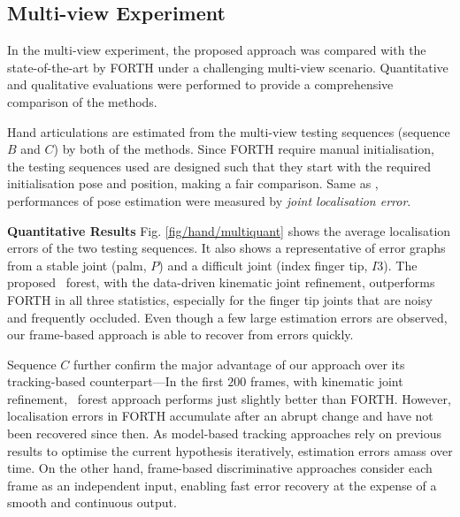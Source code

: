 
\subsection{Multi-view Experiment}  

In the multi-view experiment, the proposed approach was compared with the state-of-the-art by FORTH\cite{Oikonomidis2011} under a challenging multi-view scenario. Quantitative and qualitative evaluations were performed to provide a comprehensive comparison of the methods. 

Hand articulations are estimated from the multi-view testing sequences (sequence $B$ and $C$) by both of the methods. 
Since FORTH require manual initialisation, the testing sequences used are designed such that they start with the required initialisation pose and position, making a fair comparison.   
Same as \cite{Oikonomidis2011},  
performances of pose estimation were measured by \emph{joint localisation error}.

\noindent \textbf{Quantitative Results}
Fig. \ref{fig/hand/multiquant} shows the average localisation errors of the two testing sequences. It also shows a representative of error graphs from a stable joint (palm, $P$) and a difficult joint (index finger tip, $I3$). The proposed \STR\ forest, with the data-driven kinematic joint refinement, outperforms FORTH in all three statistics, especially for the finger tip joints that are noisy and frequently occluded. Even though a few large estimation errors are observed, our frame-based approach is able to recover from errors quickly.    

Sequence $C$ further confirm the major advantage of our approach over its tracking-based counterpart---In the first $200$ frames, with kinematic joint refinement, \STR\ forest approach performs just slightly better than FORTH. However, localisation errors in FORTH accumulate after an abrupt change and have not been recovered since then. As model-based tracking approaches rely on previous results to optimise the current hypothesis iteratively, estimation errors amass over time. On the other hand, frame-based discriminative approaches consider each frame as an independent input, enabling fast error recovery at the expense of a smooth and continuous output. 

